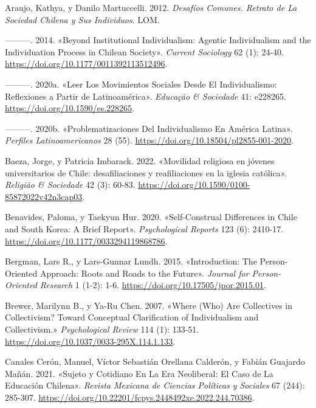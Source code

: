 \documentclass[
  letterpaper,
  DIV=11,
  numbers=noendperiod]{scrartcl}
\newlength{\cslhangindent}
\newenvironment{CSLReferences}[2] %
 {\begin{list}{}{%
  \setlength{\itemindent}{0pt}
  \setlength{\leftmargin}{0pt}
  \setlength{\parsep}{0pt}
  \ifodd #1
   \setlength{\leftmargin}{\cslhangindent}
   \setlength{\itemindent}{-1\cslhangindent}
  \fi
  \setlength{\itemsep}{#2\baselineskip}}}
 {\end{list}}
\begin{document}
\label{refs}
\begin{CSLReferences}{1}{0}
Araujo, Kathya, y Danilo Martuccelli. 2012. \emph{Desaf{í}os {Comunes}.
{Retrato} de La Sociedad Chilena y Sus Individuos}. LOM.

---------. 2014. {«Beyond Institutional Individualism: {Agentic}
Individualism and the Individuation Process in {Chilean} Society»}.
\emph{Current Sociology} 62 (1): 24-40.
\url{https://doi.org/10.1177/0011392113512496}.

---------. 2020a. {«Leer Los Movimientos Sociales Desde El
Individualismo: {Reflexiones} a Partir de {Latinoam{é}rica}»}.
\emph{Educa{ç}{ã}o \& Sociedade} 41: e228265.
\url{https://doi.org/10.1590/es.228265}.

---------. 2020b. {«Problematizaciones Del Individualismo En {Am{é}rica
Latina}»}. \emph{Perfiles Latinoamericanos} 28 (55).
\url{https://doi.org/10.18504/pl2855-001-2020}.

Baeza, Jorge, y Patricia Imbarack. 2022. {«{Movilidad religiosa en
j{ó}venes universitarios de Chile: desafiliaciones y reafiliaciones en
la iglesia cat{ó}lica}»}. \emph{Religi{ã}o \& Sociedade} 42 (3): 60-83.
\url{https://doi.org/10.1590/0100-85872022v42n3cap03}.

Benavides, Paloma, y Taekyun Hur. 2020. {«Self-{Construal Differences}
in {Chile} and {South Korea}: {A Brief Report}»}. \emph{Psychological
Reports} 123 (6): 2410-17.
\url{https://doi.org/10.1177/0033294119868786}.

Bergman, Lars R., y Lars-Gunnar Lundh. 2015. {«Introduction: {The}
Person-Oriented Approach: {Roots} and Roads to the Future»}.
\emph{Journal for Person-Oriented Research} 1 (1-2): 1-6.
\url{https://doi.org/10.17505/jpor.2015.01}.

Brewer, Marilynn B., y Ya-Ru Chen. 2007. {«Where ({Who}) {Are
Collectives} in {Collectivism}? {Toward Conceptual Clarification} of
{Individualism} and {Collectivism}.»} \emph{Psychological Review} 114
(1): 133-51. \url{https://doi.org/10.1037/0033-295X.114.1.133}.

Canales Cerón, Manuel, Víctor Sebastián Orellana Calderón, y Fabián
Guajardo Mañán. 2021. {«Sujeto y Cotidiano En La Era Neoliberal: El Caso
de La Educaci{ó}n Chilena»}. \emph{Revista Mexicana de Ciencias
Pol{í}ticas y Sociales} 67 (244): 285-307.
\url{https://doi.org/10.22201/fcpys.2448492xe.2022.244.70386}.


\end{CSLReferences}
\end{document}
